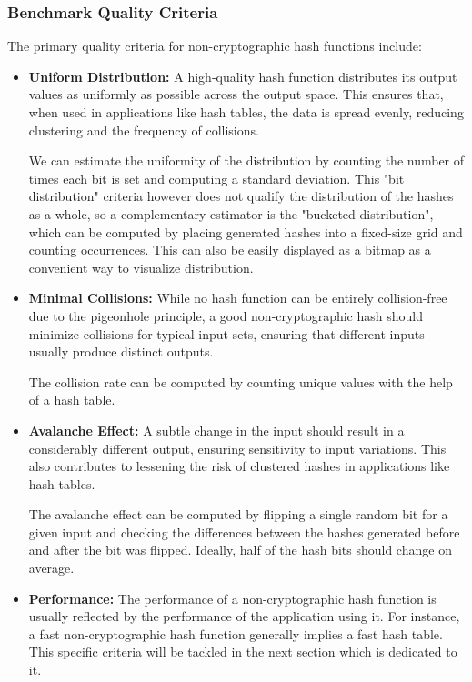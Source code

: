 \documentclass[10pt]{article}
\begin{document}
\subsubsection{Benchmark Quality Criteria}
The primary quality criteria for non-cryptographic hash functions include:

\begin{itemize}
    \item \textbf{Uniform Distribution:} A high-quality hash function distributes its output values as uniformly as possible across the output space. This ensures that, when used in applications like hash tables, the data is spread evenly, reducing clustering and the frequency of collisions.

    We can estimate the uniformity of the distribution by counting the number of times each bit is set and computing a standard deviation. This "bit distribution" criteria however does not qualify the distribution of the hashes as a whole, so a complementary estimator is the "bucketed distribution", which can be computed by placing generated hashes into a fixed-size grid and counting occurrences. This can also be easily displayed as a bitmap as a convenient way to visualize distribution.
    \item \textbf{Minimal Collisions:} While no hash function can be entirely collision-free due to the pigeonhole principle, a good non-cryptographic hash should minimize collisions for typical input sets, ensuring that different inputs usually produce distinct outputs.
    
    The collision rate can be computed by counting unique values with the help of a hash table.
    \item \textbf{Avalanche Effect:} A subtle change in the input should result in a considerably different output, ensuring sensitivity to input variations. This also contributes to lessening the risk of clustered hashes in applications like hash tables.
    
    The avalanche effect can be computed by flipping a single random bit for a given input and checking the differences between the hashes generated before and after the bit was flipped. Ideally, half of the hash bits should change on average.
    \item \textbf{Performance:} The performance of a non-cryptographic hash function is usually reflected by the performance of the application using it. For instance, a fast non-cryptographic hash function generally implies a fast hash table. This specific criteria will be tackled in the next section which is dedicated to it. 

\end{itemize}
\end{document}
